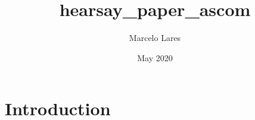 \documentclass{article}
\title{hearsay_paper_ascom}
\author{Marcelo Lares}
\date{May 2020}
\begin{document}
\maketitle

\section{Introduction}
\end{document}

